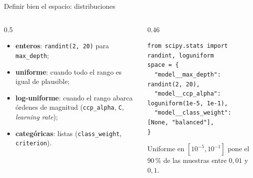 \documentclass[aspectratio=169,12pt]{beamer}
\begin{document}
\begin{frame}[fragile]{Definir bien el espacio: distribuciones}
  \begin{columns}[T]
    \begin{column}{0.5\textwidth}
      \small
      \begin{itemize}
        \item \textbf{enteros}: \texttt{randint(2, 20)} para \texttt{max\_depth};
        \item \textbf{uniforme}: cuando todo el rango es igual de plausible;
        \item \textbf{log-uniforme}: cuando el rango abarca órdenes de magnitud (\texttt{ccp\_alpha}, \texttt{C}, \emph{learning rate});
        \item \textbf{categóricas}: listas (\texttt{class\_weight}, \texttt{criterion}).
      \end{itemize}
    \end{column}
    \begin{column}{0.46\textwidth}
\begin{lstlisting}[basicstyle=\ttfamily\scriptsize,columns=fullflexible,keepspaces=true,numbers=none]
from scipy.stats import randint, loguniform
space = {
  "model__max_depth": randint(2, 20),
  "model__ccp_alpha": loguniform(1e-5, 1e-1),
  "model__class_weight": [None, "balanced"],
}
\end{lstlisting}
      \begin{rulebox}
        \footnotesize Uniforme en $[10^{-5}, 10^{-1}]$ pone el 90\,\% de las muestras entre $0{,}01$ y $0{,}1$.
      \end{rulebox}
    \end{column}
  \end{columns}
\end{frame}
\end{document}
